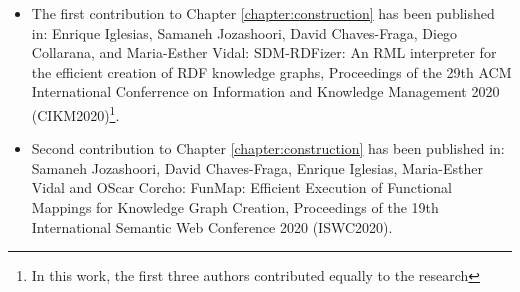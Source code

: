 \begin{itemize}
    \item The first contribution to Chapter \ref{chapter:construction} has been published in: Enrique Iglesias, Samaneh Jozashoori, David Chaves-Fraga, Diego Collarana, and Maria-Esther Vidal: SDM-RDFizer: An RML interpreter for the efficient creation of RDF knowledge graphs, Proceedings of the 29th ACM International Conferrence on Information and Knowledge Management 2020 (CIKM2020)\footnote{In this work, the first three authors contributed equally to the research}.
    \item Second contribution to Chapter \ref{chapter:construction} has been published in: Samaneh Jozashoori, David Chaves-Fraga, Enrique Iglesias, Maria-Esther Vidal and OScar Corcho: FunMap: Efficient Execution of Functional Mappings for Knowledge Graph Creation, Proceedings of the 19th International Semantic Web Conference 2020 (ISWC2020).
    
\end{itemize}



